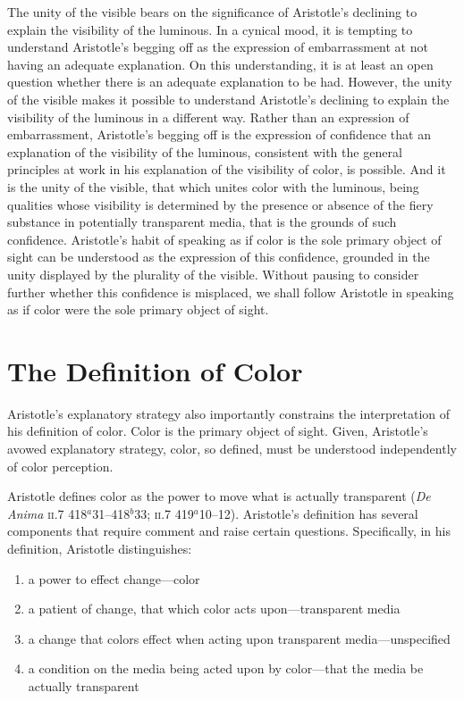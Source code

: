 The unity of the visible bears on the significance of Aristotle's declining to explain the visibility of the luminous. In a cynical mood, it is tempting to understand Aristotle's begging off as the expression of embarrassment at not having an adequate explanation. On this understanding, it is at least an open question whether there is an adequate explanation to be had. However, the unity of the visible makes it possible to understand Aristotle's declining to explain the visibility of the luminous in a different way. Rather than an expression of embarrassment, Aristotle's begging off is the expression of confidence that an explanation of the visibility of the luminous, consistent with the general principles at work in his explanation of the visibility of color, is possible. And it is the unity of the visible, that which unites color with the luminous, being qualities whose visibility is determined by the presence or absence of the fiery substance in potentially transparent media, that is the grounds of such confidence. Aristotle's habit of speaking as if color is the sole primary object of sight can be understood as the expression of this confidence, grounded in the unity displayed by the plurality of the visible. Without pausing to consider further whether this confidence is misplaced, we shall follow Aristotle in speaking as if color were the sole primary object of sight.


\section{The Definition of Color} %
\label{sec:the_definition_of_color}

Aristotle's explanatory strategy also importantly constrains the interpretation of his definition of color. Color is the primary object of sight. Given, Aristotle's avowed explanatory strategy, color, so defined, must be understood independently of color perception.

Aristotle defines color as the power to move what is actually transparent (\emph{De Anima} \textsc{ii}.7 418\( ^{a} \)31--418\( ^{b} \)33; \textsc{ii}.7 419\( ^{a} \)10--12). Aristotle's definition has several components that require comment and raise certain questions. Specifically, in his definition, Aristotle distinguishes: 
\begin{enumerate}[(1)]
	\item a power to effect change---color
	\item a patient of change, that which color acts upon---transparent media
	\item a change that colors effect when acting upon transparent media---unspecified
	\item  a condition on the media being acted upon by color---that the media be actually transparent
\end{enumerate}

